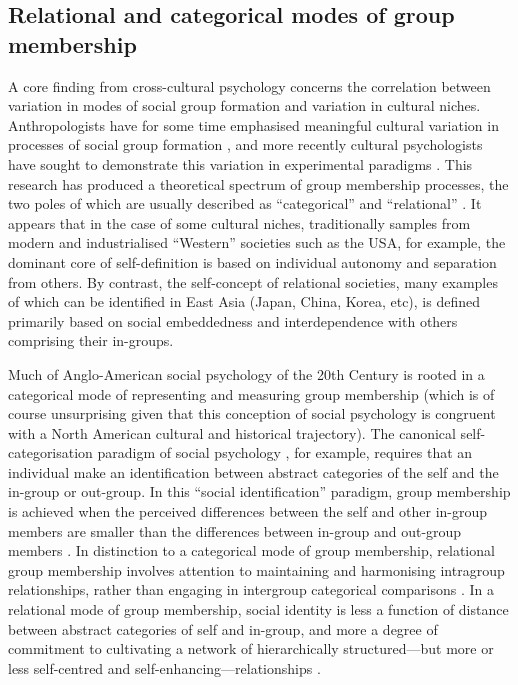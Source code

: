 {\subsection{Relational and categorical modes of group membership}

A core finding from cross-cultural psychology concerns the correlation between variation in modes of social group formation and variation in cultural niches.  Anthropologists have for some time emphasised meaningful cultural variation in processes of social group formation \citep{Strodtbeck1961,Kluckhohn1961,Mead1967,Fei1992}, and more recently cultural psychologists have sought to demonstrate this variation in experimental paradigms \citep{Markus1991,Nisbett2001}.
This research has produced a theoretical spectrum of group membership processes, the two poles of which are usually described as ``categorical'' and ``relational'' \citep{Hofstede1980,Brewer2007}.  It appears that in the case of some cultural niches, traditionally samples from modern and industrialised ``Western'' societies such as the USA, for example, the dominant core of self-definition is based on individual autonomy and separation from others.  By contrast, the self-concept of relational societies, many examples of which can be identified in East Asia (Japan, China, Korea, etc), is defined primarily based on social embeddedness and interdependence with others comprising their in-groups\citep{Leung2012}.

Much of Anglo-American social psychology of the 20th Century is rooted in a categorical mode of representing and measuring group membership (which is of course unsurprising given that this conception of social psychology is congruent with a North American cultural and historical trajectory).  The canonical self-categorisation paradigm of social psychology \citep{Turner1987}, for example, requires that an individual make an identification between abstract categories of the self and the in-group or out-group. In this ``social identification'' paradigm, group membership is achieved when the perceived differences between the self and other in-group members are smaller than the differences between in-group and out-group members \citep{Yuki2014}.  In distinction to a categorical mode of group membership, relational group membership involves attention to maintaining and harmonising intragroup relationships, rather than engaging in intergroup categorical comparisons \citep{Yuki2003}.  In a relational mode of group membership, social identity is less a function of distance between abstract categories of self and in-group, and more a degree of commitment to cultivating a network of hierarchically structured---but more or less self-centred and self-enhancing---relationships \citep{Liu2009,Nisbett2003}.

}
